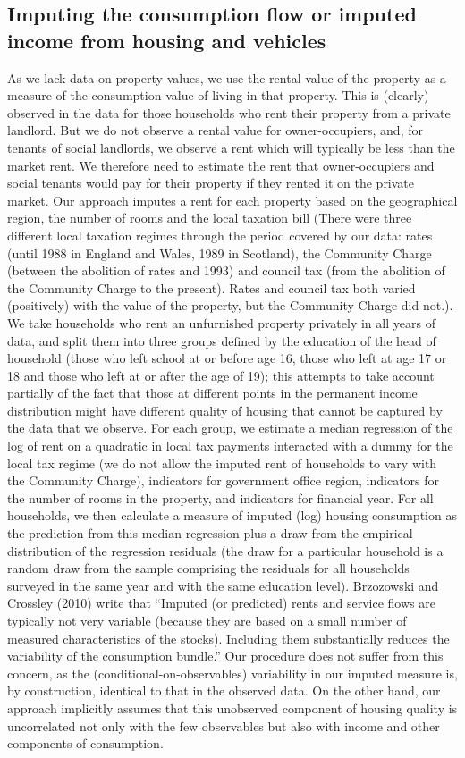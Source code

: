 \subsection{Imputing the consumption flow or imputed income from housing and vehicles}
As we lack data on property values, we use the rental value of the property as a measure of the consumption value of living in that property. This is (clearly) observed in the data for those households who rent their property from a private landlord. But we do not observe a rental value for owner-occupiers, and, for tenants of social landlords, we observe a rent which will typically be less than the market rent. We therefore need to estimate the rent that owner-occupiers and social tenants would pay for their property if they rented it on the private market. Our approach imputes a rent for each property based on the geographical region, the number of rooms and the local taxation bill (There were three different local taxation regimes through the period covered by our data: rates (until 1988 in England and Wales, 1989 in Scotland), the Community Charge (between the abolition of rates and 1993) and council tax (from the abolition of the Community Charge to the present). Rates and council tax both varied (positively) with the value of the property, but the Community Charge did not.).  We take households who rent an unfurnished property privately in all years of data, and split them into three groups defined by the education of the head of household (those who left school at or before age 16, those who left at age 17 or 18 and those who left at or after the age of 19); this attempts to take account partially of the fact that those at different points in the permanent income distribution might have different quality of housing that cannot be captured by the data that we observe. For each group, we estimate a median regression of the log of rent on a quadratic in local tax payments interacted with a dummy for the local tax regime (we do not allow the imputed rent of households to vary with the Community Charge), indicators for government office region, indicators for the number of rooms in the property, and indicators for financial year.  For all households, we then calculate a measure of imputed (log) housing consumption as the prediction from this median regression plus a draw from the empirical distribution of the regression residuals (the draw for a particular household is a random draw from the sample comprising the residuals for all households surveyed in the same year and with the same education level). Brzozowski and Crossley  (2010) write that ``Imputed (or predicted) rents and service flows are typically not very variable (because they are based on a small number of measured characteristics of the stocks). Including them substantially reduces the variability of the consumption bundle.'' Our procedure does not suffer from this concern, as the  (conditional-on-observables) variability in our imputed measure is, by construction, identical to that in the observed data. On the other hand, our approach implicitly assumes that this unobserved component of housing quality is uncorrelated not only with the few observables but also with income and other components of consumption.


